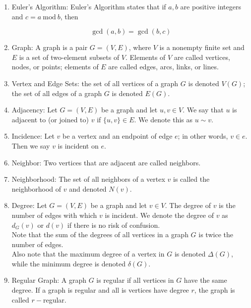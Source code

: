 \documentclass{article}
\begin{document}
\begin{enumerate}
		\item Euler's Algorithm: Euler's Algorithm states that if $a,b$ are positive integers and $c=a\: \text{mod} \: b$, then
		
		\[\gcd(a,b)=\gcd(b, c)\]
		
		\item Graph: A graph is a pair $G=(V,E)$, where $V$ is a nonempty finite set and $E$ is a set of two-element subsets of $V$.
		Elements of $V$ are called vertices, nodes, or points;
		elements of $E$ are called edges, arcs, links, or lines.
		
		\item Vertex and Edge Sets: the set of all vertices of a graph $G$ is denoted $V(G)$; the set of all edges of a graph $G$ is denoted $E(G)$.
		
		\item Adjacency: Let $G=(V,E)$ be a graph and let $u,v\in V$.
		We say that $u$ is adjacent to (or joined to) $v$ if $\{u,v\}\in E$.
		We denote this as $u\sim v$.
		
		\item Incidence: Let $v$ be a vertex and an endpoint of edge $e$; in other words, $v\in e$.
		Then we say $v$ is incident on $e$.
		
		\item Neighbor: Two vertices that are adjacent are called neighbors.
		
		\item Neighborhood: The set of all neighbors of a vertex $v$ is called the neighborhood of $v$ and denoted $N(v)$.
		
		\item Degree: Let $G=(V,E)$ be a graph and let $v\in V$.
		The degree of $v$ is the number of edges with which $v$ is incident.
		We denote the degree of $v$ as $d_G(v)$ or $d(v)$ if there is no risk of confusion.\\
		
		Note that the sum of the degrees of all vertices in a graph $G$ is twice the number of edges.\\
		
		Also note that the maximum degree of a vertex in $G$ is denoted $\Delta(G)$, while the minimum degree is denoted $\delta(G)$.
		
		\item Regular Graph: A graph $G$ is regular if all vertices in $G$ have the same degree.
		If a graph is regular and all is vertices have degree $r$, the graph is called $r-$regular.
		

\end{enumerate}
\end{document}
